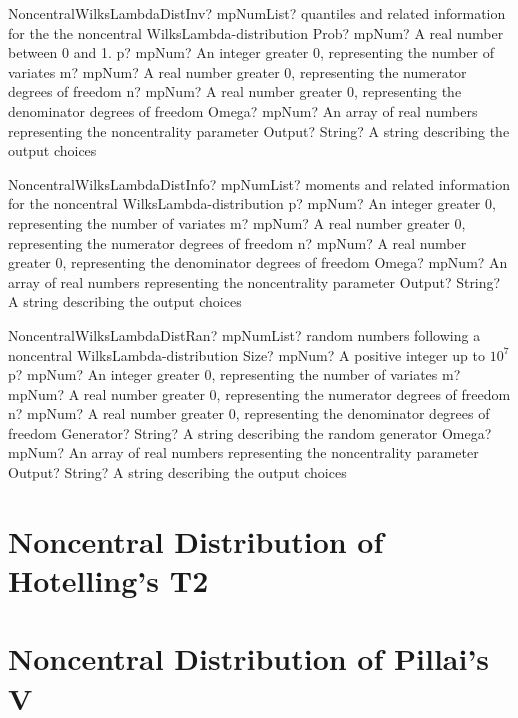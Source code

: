 \documentclass[12pt,a4paper,openany]{book}
\begin{document}
\begin{mpFunctionsExtract}
\mpFunctionSixNotImplemented
{NoncentralWilksLambdaDistInv? mpNumList? quantiles and related information for the the noncentral WilksLambda-distribution}
{Prob? mpNum? A real number between 0 and 1.}
{p? mpNum? An integer greater 0, representing the number of variates}
{m? mpNum? A real number greater 0, representing the numerator  degrees of freedom}
{n? mpNum? A real number greater 0, representing the denominator degrees of freedom}
{Omega? mpNum? An array of real numbers representing the noncentrality parameter}
{Output? String? A string describing the output choices}
\end{mpFunctionsExtract}

\begin{mpFunctionsExtract}
\mpFunctionFiveNotImplemented
{NoncentralWilksLambdaDistInfo? mpNumList? moments and related information for the noncentral WilksLambda-distribution}
{p? mpNum? An integer greater 0, representing the number of variates}
{m? mpNum? A real number greater 0, representing the numerator  degrees of freedom}
{n? mpNum? A real number greater 0, representing the denominator degrees of freedom}
{Omega? mpNum? An array of real numbers representing the noncentrality parameter}
{Output? String? A string describing the output choices}
\end{mpFunctionsExtract}

\begin{mpFunctionsExtract}
\mpFunctionSevenNotImplemented
{NoncentralWilksLambdaDistRan? mpNumList? random numbers following a noncentral WilksLambda-distribution}
{Size? mpNum? A positive integer up to $10^7$}
{p? mpNum? An integer greater 0, representing the number of variates}
{m? mpNum? A real number greater 0, representing the numerator  degrees of freedom}
{n? mpNum? A real number greater 0, representing the denominator degrees of freedom}
{Generator? String? A string describing the random generator}
{Omega? mpNum? An array of real numbers representing the noncentrality parameter}
{Output? String? A string describing the output choices}
\end{mpFunctionsExtract}

\section{Noncentral Distribution of Hotelling's T2}

\section{Noncentral Distribution of Pillai's V}
\end{document}
